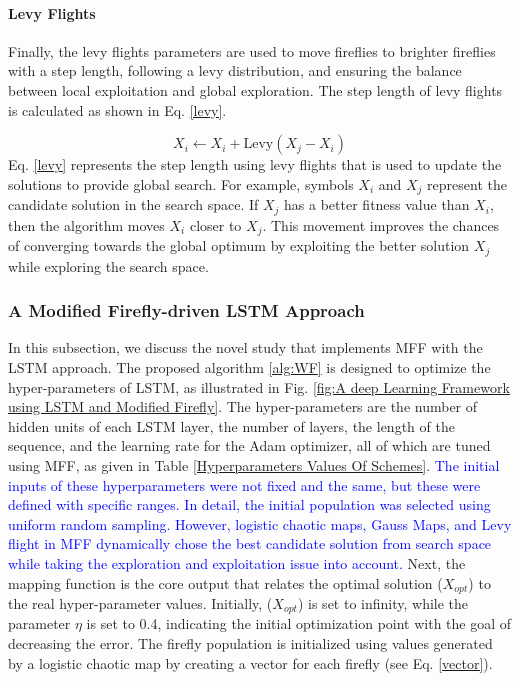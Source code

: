 \documentclass[journal]{IEEEtran}
\begin{document}
\paragraph{Levy Flights}
Finally, the levy flights parameters
are used to move fireflies to brighter fireflies with a step length, following a levy distribution, and ensuring the balance between local exploitation and global exploration. The step length of levy flights is calculated as shown in Eq. \eqref{levy}.

\begin{equation}\label{levy}
    X_i \leftarrow X_i + \text{Levy}(X_j - X_i)
\end{equation}
Eq. \eqref{levy} represents the step length using levy flights that is used to update the solutions to provide global search.  For example, symbols \(X_i\) and \(X_j\) represent the candidate solution in the search space. If \(X_j\) has a better fitness value than \(X_i\), then the algorithm moves \(X_i\) closer to \(X_j\). This movement improves the chances of converging towards the global optimum by exploiting the better solution \(X_j\) while exploring the search space.








\subsubsection{A Modified Firefly-driven LSTM Approach}


            In this subsection, we discuss the novel study that implements MFF with the LSTM approach.
            The proposed algorithm \ref{alg:WF} is designed to optimize the hyper-parameters of LSTM, as illustrated in Fig. \ref{fig:A deep Learning Framework using LSTM and Modified Firefly}. The hyper-parameters are the number of hidden units of each LSTM layer, the number of layers, the length of the sequence, and the learning rate for the Adam optimizer, all of which are tuned using MFF, as given in Table \ref{Hyperparameters Values Of Schemes}. \textcolor{blue}{The initial inputs of these hyperparameters were not fixed and the same, but these were defined with specific ranges. In detail, the initial population was selected using uniform random sampling. However, logistic chaotic maps, Gauss Maps, and Levy flight in MFF dynamically chose the best candidate solution from search space while taking the exploration and exploitation issue into account.} Next, the mapping function is the core output that relates the optimal solution ($X_{opt}$) to the real hyper-parameter values.
Initially, ($X_{opt}$) is set to infinity, while the parameter $\eta$ is set to 0.4, indicating the initial optimization point with the goal of decreasing the error. The firefly population is initialized using values generated by a logistic chaotic map by creating a vector for each firefly (see Eq. \eqref{vector}).
\end{document}
